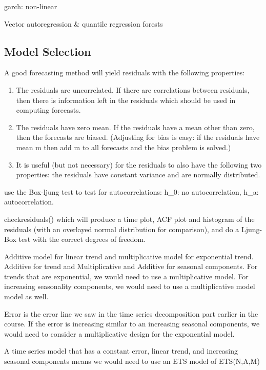 \documentclass[]{book}
\begin{document}
garch: non-linear

Vector autoregression \& quantile regression forests

\hypertarget{model-selection}{%
\subsection{Model Selection}\label{model-selection}}

A good forecasting method will yield residuals with the following properties:

\begin{enumerate}
\def\labelenumi{\arabic{enumi})}
\item
  The residuals are uncorrelated. If there are correlations between residuals, then there is information left in the residuals which should be used in computing forecasts.
\item
  The residuals have zero mean. If the residuals have a mean other than zero, then the forecasts are biased. (Adjusting for bias is easy: if the residuals have mean m then add m to all forecasts and the bias problem is solved.)
\item
  It is useful (but not necessary) for the residuals to also have the following two properties: the residuals have constant variance and are normally distributed.
\end{enumerate}

use the Box-ljung test to test for autocorrelations: h\_0: no autocorrelation, h\_a: autocorrelation.

checkresiduals() which will produce a time plot, ACF plot and histogram of the residuals (with an overlayed normal distribution for comparison), and do a Ljung-Box test with the correct degrees of freedom.

Additive model for linear trend and multiplicative model for exponential trend. Additive for trend and Multiplicative and Additive for seasonal components. For trends that are exponential, we would need to use a multiplicative model. For increasing seasonality components, we would need to use a multiplicative model model as well.

Error is the error line we saw in the time series decomposition part earlier in the course. If the error is increasing similar to an increasing seasonal components, we would need to consider a multiplicative design for the exponential model.

A time series model that has a constant error, linear trend, and increasing seasonal components means we would need to use an ETS model of ETS(N,A,M)
\end{document}
